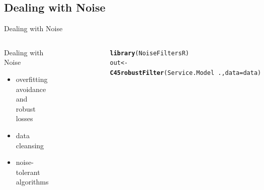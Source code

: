 \documentclass{beamer}\usepackage[]{graphicx}\usepackage[]{color}
\makeatletter
\newcommand{\hlopt}[1]{\textcolor[rgb]{0,0,0}{#1}}%
\newcommand{\hlstd}[1]{\textcolor[rgb]{0.345,0.345,0.345}{#1}}%
\newcommand{\hlkwb}[1]{\textcolor[rgb]{0.69,0.353,0.396}{#1}}%
\newcommand{\hlkwc}[1]{\textcolor[rgb]{0.333,0.667,0.333}{#1}}%
\newcommand{\hlkwd}[1]{\textcolor[rgb]{0.737,0.353,0.396}{\textbf{#1}}}%
\newenvironment{kframe}{%
 \def\at@end@of@kframe{}%
 \ifinner\ifhmode%
  \def\at@end@of@kframe{\end{minipage}}%
  \begin{minipage}{\columnwidth}%
 \fi\fi%
 \def\FrameCommand##1{\hskip\@totalleftmargin \hskip-\fboxsep
 \colorbox{shadecolor}{##1}\hskip-\fboxsep
     \hskip-\linewidth \hskip-\@totalleftmargin \hskip\columnwidth}%
 \MakeFramed {\advance\hsize-\width
   \@totalleftmargin\z@ \linewidth\hsize
   \@setminipage}}%
 {\par\unskip\endMakeFramed%
 \at@end@of@kframe}
\newenvironment{knitrout}{}{} %
\makeatother
\begin{document}
\subsection{Dealing with Noise}
\begin{frame}[fragile]{Dealing with Noise}
\begin{columns}[c] %
\small
\begin{block}{\small Dealing with Noise}
\begin{itemize}
\item overfitting avoidance and robust losses
\item data cleansing
\item noise-tolerant algorithms
\end{itemize}
\end{block}
\begin{figure}
	\includegraphics[width=\linewidth]{NoiseFiltersR.png}
\end{figure}
\tiny
\begin{knitrout}
\color{fgcolor}\begin{kframe}
\begin{alltt}
\hlkwd{library}\hlstd{(NoiseFiltersR)}
\hlstd{out} \hlkwb{<-} \hlkwd{C45robustFilter}\hlstd{(Service.Model} \hlopt{~}\hlstd{.,}\hlkwc{data} \hlstd{= data)}
\end{alltt}


{\ttfamily\noindent\itshape\color{messagecolor}{\#\# Iteration 1: 21897 instances removed}}

{\ttfamily\noindent\itshape\color{messagecolor}{\#\# Iteration 2: 572 instances removed}}

{\ttfamily\noindent\itshape\color{messagecolor}{\#\# Iteration 3: 192 instances removed}}


\end{kframe}
\end{knitrout}
\end{columns}
\end{frame}
\end{document}
